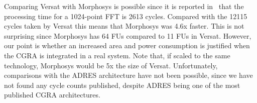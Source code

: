 Comparing Versat with Morphosys is possible since it is reported
in~\cite{Kamalizad03} that the processing time for a 1024-point FFT is
2613 cycles. Compared with the 12115 cycles taken by Versat this means
that Morphosys was 4.6x faster. This is not surprising since Morphosys
has 64 FUs compared to 11 FUs in Versat. However, our point is whether
an increased area and power consumption is justified when the CGRA is
integrated in a real system. Note that, if scaled to the same
technology, Morphosys would be 5x the size of Versat. Unfortunately,
comparisons with the ADRES architecture have not been possible, since
we have not found any cycle counts published, despite ADRES being one
of the most published CGRA architectures.


